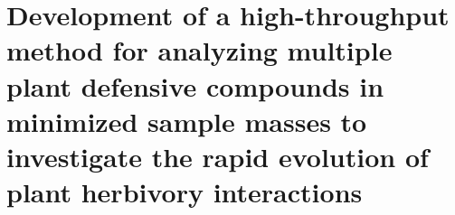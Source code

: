 \chapter{Development of a high-throughput method for analyzing multiple plant defensive compounds in minimized sample masses to investigate the rapid evolution of plant herbivory interactions}

%
%
\makebibliographypage
%
%